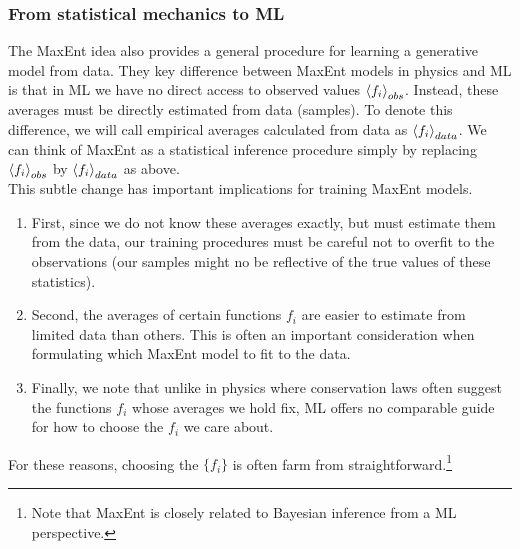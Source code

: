 \subsubsection{From statistical mechanics to ML}
The MaxEnt idea also provides a general procedure for learning a generative model from data. They key difference between MaxEnt models in physics and ML is that in ML we have no direct access to observed values $\expval{f_i}_{obs}$. Instead, these averages must be directly estimated from data (samples). To denote this difference, we will call empirical averages calculated from data as $\expval{f_i}_{data}$. We can think of MaxEnt as a statistical inference procedure simply by replacing $\expval{f_i}_{obs}$ by $\expval{f_i}_{data}$ as above.\\
This subtle change has important implications for training MaxEnt models. 
\begin{enumerate}
\item First, since we do not know these averages exactly, but must estimate them from the data, our training procedures must be careful not to overfit to the observations (our samples might no be reflective of the true values of these statistics). 
\item Second, the averages of certain functions $f_i$ are easier to estimate from limited data than others. This is often an important consideration when formulating which MaxEnt model to fit to the data.
\item Finally, we note that unlike in physics where conservation laws often suggest the functions $f_i$ whose averages we hold fix, ML offers no comparable guide for how to choose the $f_i$ we care about.
\end{enumerate}
For these reasons, choosing the $\{f_i\}$ is often farm from straightforward.\footnote{Note that MaxEnt is closely related to Bayesian inference from a ML perspective.}

